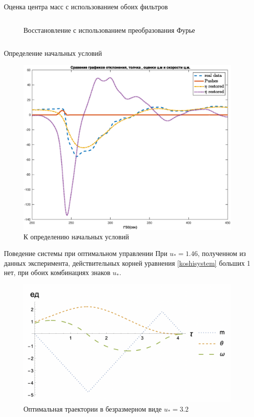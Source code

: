 \documentclass[10pt]{beamer}
\begin{document}
\begin{frame}{Оценка центра масс с использованием обоих фильтров}
\begin{columns}
\begin{figure}[h!]
			\caption{Восстановление с использованием преобразования Фурье}
			\label{restore_fur_real}
		\end{figure}
	\end{columns}
\end{frame}
\begin{frame}{Определение начальных условий}
	\begin{figure}[h!]
		\centering
		\includegraphics[width=0.9\linewidth]{images/modif_legend.eps}
		\caption{К определению начальных условий}
		\label{restore_double_real}
	\end{figure}
\end{frame}

\begin{frame}{Поведение системы при оптимальном управлении}
	При $u_\ast=1.46$, полученном из данных эксперимента, действительных корней уравнения \eqref{koshisystem} больших 1 нет,
	при обоих комбинациях знаков $u_\ast$.
	\begin{figure}[h!]
		\centering
		\includegraphics[width=0.7\linewidth]{3_graphs.png}
		\caption{Оптимальная траектории в безразмерном виде $u_\ast=3.2$ }
		\label{3_graphs}
	\end{figure}
\end{frame}
\end{document}

